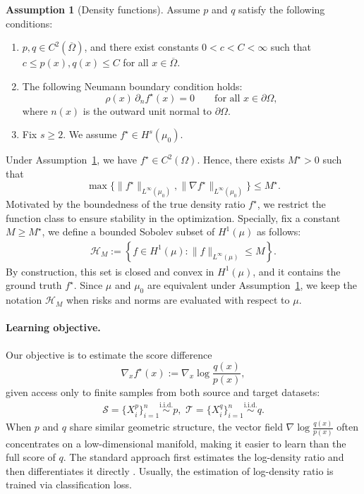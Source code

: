 \documentclass[11pt]{article}
\newcommand{\cS}{\mathcal{S}}
\newcommand{\cT}{\mathcal{T}}
\theoremstyle{plain}
\theoremstyle{definition}
\newtheorem{assumption}[theorem]{Assumption}
\theoremstyle{remark}
\begin{document}
\begin{assumption}[Density functions]\label{assm: density}
Assume  $p$ and $q$ satisfy the following conditions:
\begin{enumerate}
\item $p,q\in C^2(\overline\Omega)$, and there exist constants \(0<c<C<\infty\) such that \(c\le p(x),q(x)\le C\) for all \(x\in\overline\Omega\).
\item The following Neumann boundary condition holds:
\[
\rho(x)\,\partial_n f^\star(x)=0
\qquad \text{for all }x\in\partial\Omega,
\]
where \(n(x)\) is the outward unit normal to \(\partial\Omega\).
\item Fix $s\geq2$. We assume $f^\star \in H^s(\mu_0)$.
\end{enumerate}
\end{assumption}
Under Assumption~\ref{assm: density}, we have $f^\star \in C^2(\Omega)$. Hence, there exists $M^\star>0$ such that
$$    \max \{\|f^\star\|_{L^\infty(\mu_0)},\| \nabla f^\star\|_{L^\infty(\mu_0)}\}\leq M^\star.$$
Motivated by the boundedness of the true density ratio
$f^\star$, we restrict the function class to ensure stability in the optimization. Specially, fix a constant $M \geq M^\star$, we define a bounded Sobolev subset of $H^1(\mu)$  as follows:
\begin{eqnarray}\label{eq:HM}
    \mathcal{H}_M:= \left\{ f \in H^1(\mu): \|f\|_{L^\infty(\mu)} \leq M \right\}.
\end{eqnarray}
By construction, this set is closed and convex in $H^1(\mu)$, and it contains the ground truth $f^\star$.
Since \(\mu\) and \(\mu_0\) are equivalent under Assumption~\ref{assm: density}, we keep the notation
\(\mathcal H_M\) when risks and norms are evaluated with respect to \(\mu\).

\paragraph{Learning objective.}
Our objective is to estimate the score difference
\[
   \nabla_x f^\star(x):= \nabla_x \log \frac{q(x)}{p(x)},
\]
given access only to finite samples from both source and target datasets:
\begin{eqnarray}\label{eq:data_set}
     \cS=\{X_{i}^{p}\}_{i=1}^{n}
      \stackrel{\text{i.i.d.}}{\sim} p,
\,\,
  \cT=\{X_{i}^{q}\}_{i=1}^{n}
      \stackrel{\text{i.i.d.}}{\sim} q.
\end{eqnarray}
When $p$ and $q$ share similar geometric structure, the vector field
$
   \nabla\log\frac{q(x)}{p(x)}
$
often concentrates on a low-dimensional manifold, making it easier to learn than the full score of $q$.  The standard approach first estimates the log-density ratio and then differentiates it directly \cite{ouyang2024transfer,kim2022refining}. Usually, the estimation of log-density ratio is trained via classification loss.
\end{document}

